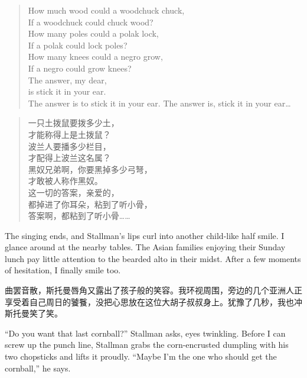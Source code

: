 \ifdefined\eng
\begin{verse}
How much wood could a woodchuck chuck,\\
If a woodchuck could chuck wood?\\
How many poles could a polak lock,\\
If a polak could lock poles?\\
How many knees could a negro grow,\\
If a negro could grow knees?\\
The answer, my dear,\\
is stick it in your ear.\\
\ifdefined\vone
The answer is to stick it in your ear.
\fi
\ifdefined\vtwo
The answer is, stick it in your ear\ldots
\fi
\end{verse}
\fi

\ifdefined\chs
\begin{verse}
一只土拨鼠要拨多少土，\\
才能称得上是土拨鼠？\\
波兰人要播多少栏目，\\
才配得上波兰这名属？\\
黑奴兄弟啊，你要黑掉多少弓弩，\\
才敢被人称作黑奴。\\
这一切的答案，亲爱的，\\
都掉进了你耳朵，粘到了听小骨，\\
答案啊，都粘到了听小骨……
\end{verse}
\fi

\ifdefined\eng
The singing ends, and Stallman's lips curl into another child-like half smile. I glance around at the nearby tables. The Asian families enjoying their Sunday lunch pay little attention to the bearded alto in their midst. After a few moments of hesitation, I finally smile too.
\fi

\ifdefined\chs
曲罢音散，斯托曼唇角又露出了孩子般的笑容。我环视周围，旁边的几个亚洲人正享受着自己周日的饕餮，没把心思放在这位大胡子叔叔身上。犹豫了几秒，我也冲斯托曼笑了笑。
\fi

\ifdefined\eng
``Do you want that last cornball?'' Stallman asks, eyes twinkling. Before I can screw up the punch line, Stallman grabs the corn-encrusted dumpling with his two chopsticks and lifts it proudly. ``Maybe I'm the one who should get the cornball,'' he says.
\fi

